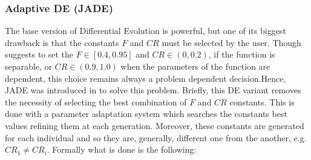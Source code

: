 \subsubsection{Adaptive DE (JADE)}
The base version of Differential Evolution is powerful, but one of its biggest drawback is that the constants $F$ and $CR$ must be selected by the user. Though \cite{RPODE:2005} suggests to set the $F\in[0.4, 0.95]$ and $CR \in (0, 0.2)$, if the function is separable, or $CR \in (0.9, 1.0)$ when the parameters of the function are dependent, this choice remains always a problem dependent decision.Hence, JADE was introduced in \cite{JADE:2009} to solve this problem.\newline\newline
Briefly, this DE variant removes the necessity of selecting the best combination of $F$ and $CR$ constants. This is done with a parameter adaptation system which searches the constants best values refining them at each generation. Moreover, these constants are generated for each individual and so they are, generally, different one from the another, e.g. $\textit{CR}_{1} \neq \textit{CR}_{i}$. Formally what is done is the following:
